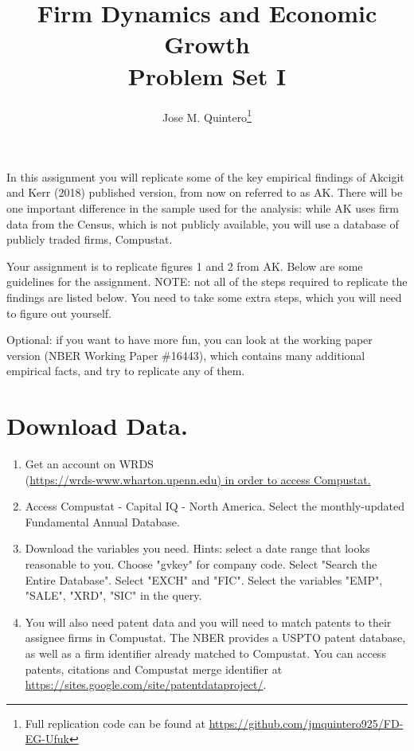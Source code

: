 \documentclass[12pt]{article}
\title{Firm Dynamics and Economic Growth \\ \large{Problem Set I}}
\author{Jose M. Quintero\thanks{Full replication code can be found at \url{https://github.com/jmquintero925/FD-EG-Ufuk}}}
\date{ }
\begin{document}
\maketitle

In this assignment you will replicate some of the key empirical findings of Akcigit and Kerr (2018) published version, from now on referred to as AK. There will be one important difference in the sample used for the analysis: while AK uses firm data from the Census, which is not publicly available, you will use a database of publicly traded firms, Compustat.

Your assignment is to replicate figures 1 and 2 from AK. Below are some guidelines for the assignment. NOTE: not all of the steps required to replicate the findings are listed below. You need to take some extra steps, which you will need to figure out yourself.

Optional: if you want to have more fun, you can look at the working paper version (NBER Working Paper \#16443), which contains many additional empirical facts, and try to replicate any of them.

\section{Download Data.}

\begin{enumerate}[leftmargin=0pt, label=\textbf{(\alph*)}]

\item Get an account on WRDS \\  (\url{https://wrds-www.wharton.upenn.edu) in order to access Compustat.}

\item Access Compustat - Capital IQ - North America. Select the monthly-updated Fundamental Annual Database.

\item Download the variables you need. Hints: select a date range that looks reasonable to you. Choose "gvkey" for company code. Select "Search the Entire Database". Select "EXCH" and "FIC". Select the variables "EMP", "SALE", "XRD", "SIC" in the query.

\item You will also need patent data and you will need to match patents to their assignee firms in Compustat. The NBER provides a USPTO patent database, as well as a firm identifier already matched to Compustat. You can access patents, citations and Compustat merge identifier at \url{https://sites.google.com/site/patentdataproject/}.

\end{enumerate}
\end{document}
